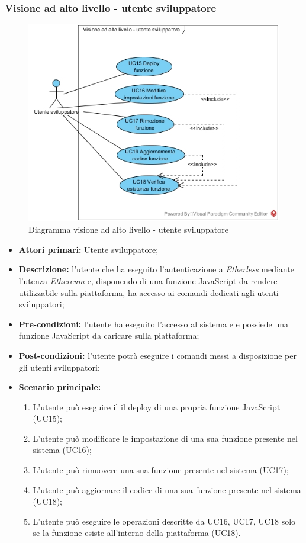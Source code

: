 \subsubsection{Visione ad alto livello - utente sviluppatore}
\begin{figure}[h]
	\centering
	\includegraphics[width=\linewidth]{res/img/utenteSviluppatore.jpg}
	\caption{Diagramma visione ad alto livello - utente sviluppatore}
\end{figure}
\begin{itemize}
	\item \textbf{Attori primari:} Utente sviluppatore;
	\item \textbf{Descrizione:} l'utente che ha eseguito l'autenticazione a \textit{Etherless} mediante l'utenza \textit{Ethereum\glo} e, disponendo di una funzione JavaScript da rendere utilizzabile sulla piattaforma, ha accesso ai comandi dedicati agli utenti sviluppatori;
	\item \textbf{Pre-condizioni:} l'utente ha eseguito l'accesso al sistema e e possiede una funzione JavaScript da caricare sulla piattaforma;
	\item \textbf{Post-condizioni:} l'utente potrà eseguire i comandi messi a disposizione per gli utenti sviluppatori;
	\item \textbf{Scenario principale:}
	\begin{enumerate}
		\item L'utente può eseguire il il deploy di una propria funzione JavaScript (UC15);
		\item L'utente può modificare le impostazione di una sua funzione presente nel sistema (UC16);
		\item L'utente può rimuovere una sua funzione presente nel sistema (UC17);
		\item L'utente può aggiornare il codice di una sua funzione presente nel sistema (UC18);
		\item L'utente può eseguire le operazioni descritte da UC16, UC17, UC18 solo se la funzione esiste all'interno della piattaforma (UC18).
	\end{enumerate}
\end{itemize}
